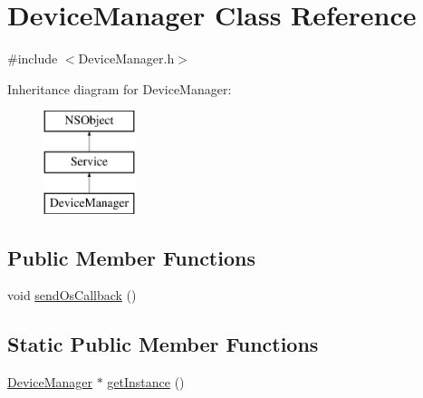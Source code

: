 \hypertarget{interface_device_manager}{
\section{\-Device\-Manager \-Class \-Reference}
\label{interface_device_manager}
}


{\ttfamily \#include $<$\-Device\-Manager.\-h$>$}

\-Inheritance diagram for \-Device\-Manager\-:\begin{figure}[H]
\begin{center}
\leavevmode
\includegraphics[height=3.000000cm]{interface_device_manager}
\end{center}
\end{figure}
\subsection*{\-Public \-Member \-Functions}
\begin{DoxyCompactItemize}
\item 
void \hyperlink{interface_device_manager_afc1f37b13b771832a2183a25eb7a4de0}{send\-Os\-Callback} ()
\end{DoxyCompactItemize}
\subsection*{\-Static \-Public \-Member \-Functions}
\begin{DoxyCompactItemize}
\item 
\hyperlink{interface_device_manager}{\-Device\-Manager} $\ast$ \hyperlink{interface_device_manager_ace872b81a071feeb70b2b4ddaee4d86b}{get\-Instance} ()
\end{DoxyCompactItemize}


